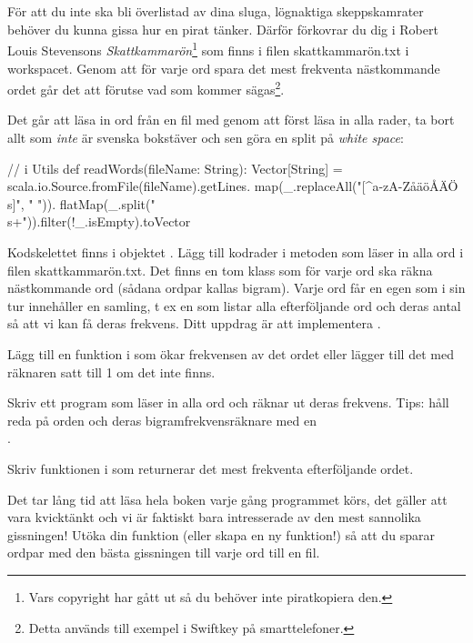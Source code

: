 \\
\noindent \\
För att du inte ska bli överlistad av dina sluga, lögnaktiga skeppskamrater behöver du kunna gissa hur en pirat tänker. Därför förkovrar du dig i Robert Louis Stevensons \emph{Skattkammarön}\footnote{Vars copyright har gått ut så du behöver inte piratkopiera den.} som finns i filen skattkammarön.txt i workspacet.  Genom att för varje ord spara det mest frekventa nästkommande ordet går det att förutse vad som kommer sägas\footnote{Detta används till exempel i Swiftkey på smarttelefoner.}. 

\Subtask Det går att läsa in ord från en fil med  genom att först läsa in alla rader, ta bort allt som {\em inte} är svenska bokstäver och sen göra en split på \emph{white space}: 
\begin{CodeSmall}
// i Utils
def readWords(fileName: String): Vector[String] = {
	   scala.io.Source.fromFile(fileName).getLines.
	   map(_.replaceAll("[^a-zA-ZåäöÅÄÖ\\s]", " ")).
	   flatMap(_.split("\\s+")).filter(!_.isEmpty).toVector
	}
\end{CodeSmall}

Kodskelettet finns i objektet . Lägg till kodrader i metoden  som läser in alla ord i filen skattkammarön.txt. Det finns en tom klass  som för varje ord ska räkna nästkommande ord (sådana ordpar kallas bigram). Varje ord får en egen  som i sin tur innehåller en samling, t ex en  som listar alla efterföljande ord och deras antal så att vi kan få deras frekvens. Ditt uppdrag är att implementera .

\Subtask Lägg till en funktion  i  som ökar frekvensen av det ordet  eller lägger till det med räknaren satt till 1 om det inte finns. 

\Subtask Skriv ett program som läser in alla ord och räknar ut deras frekvens. Tips: håll reda på orden och deras bigramfrekvensräknare med en \\
.

\Subtask Skriv funktionen  i  som returnerar det mest frekventa efterföljande ordet. 

\Subtask Det tar lång tid att läsa hela boken varje gång programmet körs, det gäller att vara kvicktänkt och vi är faktiskt bara intresserade av den mest sannolika gissningen! Utöka din funktion  (eller skapa en ny funktion!) så att du sparar ordpar  med den bästa gissningen till varje ord till en fil. 

